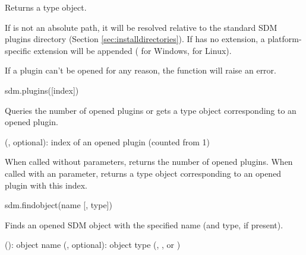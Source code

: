 \documentclass[a4paper,12pt,twoside,extrafontsizes]{memoir}
\begin{document}
\begin{funcret}
	Returns a  type object.
\end{funcret}

\begin{funcremarks}
	If  is not an absolute path, it will be resolved relative to the standard SDM plugins directory (Section \ref{sec:installdirectories}). If  has no extension, a platform-specific extension will be appended ( for Windows,  for Linux).
	
	If a plugin can't be opened for any reason, the function will raise an error.
\end{funcremarks}


\begin{luafuncprototype}
sdm.plugins([index])
\end{luafuncprototype}

\begin{funcdescr}
	Queries the number of opened plugins or gets a  type object corresponding to an opened plugin.
\end{funcdescr}

\begin{funcparams}
	 (, optional): index of an opened plugin (counted from 1)
\end{funcparams}

\begin{funcret}
	When called without parameters, returns the number of opened plugins. When called with an  parameter, returns a  type object corresponding to an opened plugin with this index.
\end{funcret}


\begin{luafuncprototype}
sdm.findobject(name [, type])
\end{luafuncprototype}

\begin{funcdescr}
	Finds an opened SDM object with the specified name (and type, if present).
\end{funcdescr}

\begin{funcparams}
	 (): object name
	 (, optional): object type (, ,  or )
\end{funcparams}
\end{document}
